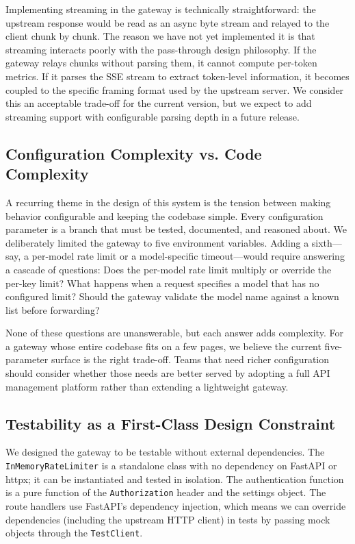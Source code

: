 \documentclass[10pt,journal]{IEEEtran}
\begin{document}
Implementing streaming in the gateway is technically straightforward: the upstream response would be read as an async byte stream and relayed to the client chunk by chunk. The reason we have not yet implemented it is that streaming interacts poorly with the pass-through design philosophy. If the gateway relays chunks without parsing them, it cannot compute per-token metrics. If it parses the SSE stream to extract token-level information, it becomes coupled to the specific framing format used by the upstream server. We consider this an acceptable trade-off for the current version, but we expect to add streaming support with configurable parsing depth in a future release.

\subsection{Configuration Complexity vs. Code Complexity}

A recurring theme in the design of this system is the tension between making behavior configurable and keeping the codebase simple. Every configuration parameter is a branch that must be tested, documented, and reasoned about. We deliberately limited the gateway to five environment variables. Adding a sixth---say, a per-model rate limit or a model-specific timeout---would require answering a cascade of questions: Does the per-model rate limit multiply or override the per-key limit? What happens when a request specifies a model that has no configured limit? Should the gateway validate the model name against a known list before forwarding?

None of these questions are unanswerable, but each answer adds complexity. For a gateway whose entire codebase fits on a few pages, we believe the current five-parameter surface is the right trade-off. Teams that need richer configuration should consider whether those needs are better served by adopting a full API management platform rather than extending a lightweight gateway.

\subsection{Testability as a First-Class Design Constraint}

We designed the gateway to be testable without external dependencies. The \texttt{InMemoryRateLimiter} is a standalone class with no dependency on FastAPI or httpx; it can be instantiated and tested in isolation. The authentication function is a pure function of the \texttt{Authorization} header and the settings object. The route handlers use FastAPI's dependency injection, which means we can override dependencies (including the upstream HTTP client) in tests by passing mock objects through the \texttt{TestClient}.
\end{document}
